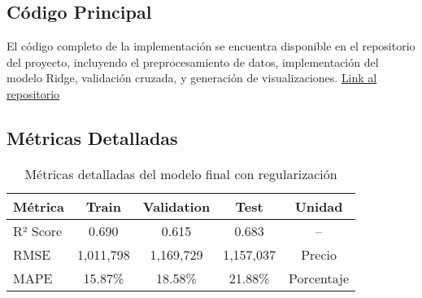 \documentclass[11pt,a4paper]{article}
\begin{document}
\subsection{Código Principal}
El código completo de la implementación se encuentra disponible en el repositorio del proyecto, incluyendo el preprocesamiento de datos, implementación del modelo Ridge, validación cruzada, y generación de visualizaciones. \href{https://github.com/DiegoAlfaro1/Portafolio-Implementacion-TC3006}{Link al repositorio}

\subsection{Métricas Detalladas}

\begin{table}[H]
    \centering
    \begin{tabular}{|l|c|c|c|c|}
    \hline
    \textbf{Métrica} & \textbf{Train} & \textbf{Validation} & \textbf{Test} & \textbf{Unidad} \\
    \hline
    R² Score & 0.690 & 0.615 & 0.683 & -- \\
    RMSE & 1,011,798 & 1,169,729 & 1,157,037 & Precio \\
    MAPE & 15.87\% & 18.58\% & 21.88\% & Porcentaje \\
    \hline
    \end{tabular}
    \caption{Métricas detalladas del modelo final con regularización}
    \label{tab:detailed_metrics}
\end{table}
\end{document}
